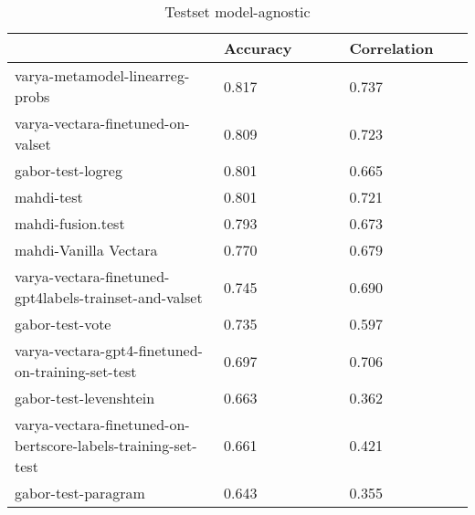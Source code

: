 \begin{table}
\centering
\caption{Testset model-agnostic}
\label{test-agnostic}
\begin{tabular}{|p{0.45\linewidth}|R{0.275\linewidth}|R{0.275\linewidth}|}
\hline
 & Accuracy & Correlation \\
\hline
varya-metamodel-linearreg-probs & 0.817 & 0.737 \\
varya-vectara-finetuned-on-valset & 0.809 & 0.723 \\
gabor-test-logreg & 0.801 & 0.665 \\
mahdi-test & 0.801 & 0.721 \\
mahdi-fusion.test & 0.793 & 0.673 \\
mahdi-Vanilla Vectara & 0.770 & 0.679 \\
varya-vectara-finetuned-gpt4labels-trainset-and-valset & 0.745 & 0.690 \\
gabor-test-vote & 0.735 & 0.597 \\
varya-vectara-gpt4-finetuned-on-training-set-test & 0.697 & 0.706 \\
gabor-test-levenshtein & 0.663 & 0.362 \\
varya-vectara-finetuned-on-bertscore-labels-training-set-test & 0.661 & 0.421 \\
gabor-test-paragram & 0.643 & 0.355 \\
\hline
\end{tabular}
\end{table}
